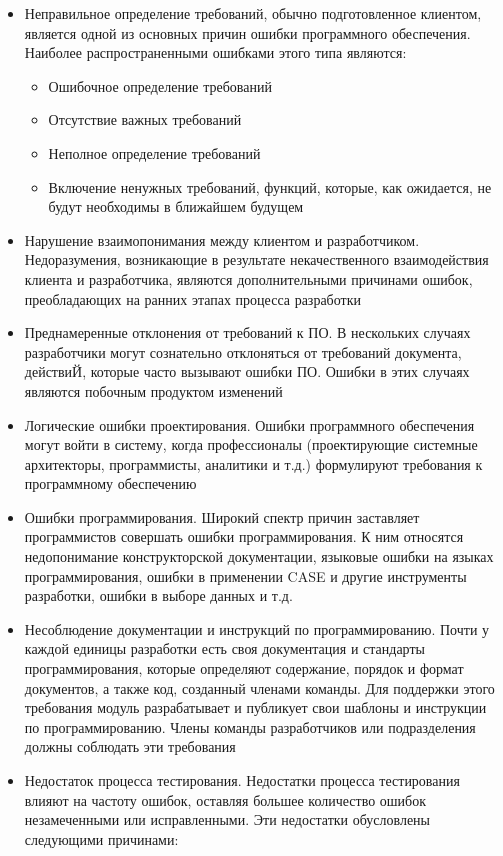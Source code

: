 \documentclass{../industrial-development}
\begin{document}
 	 \begin{itemize}
\item Неправильное определение требований, обычно подготовленное клиентом, является одной из основных причин ошибки программного обеспечения. Наиболее распространенными ошибками этого типа являются:
		\begin{itemize}
	\item Ошибочное определение требований
	\item Отсутствие важных требований
	\item Неполное определение требований
	\item Включение ненужных требований, функций, которые, как ожидается, не будут необходимы в ближайшем будущем
  		\end{itemize}
\item Нарушение взаимопонимания между клиентом и разработчиком. Недоразумения, возникающие в результате некачественного взаимодействия клиента и разработчика, являются дополнительными причинами ошибок, преобладающих на ранних этапах процесса разработки
\item Преднамеренные отклонения от требований к ПО. В нескольких случаях разработчики могут сознательно отклоняться от требований документа, действиЙ, которые часто вызывают ошибки ПО. Ошибки в этих случаях являются побочным продуктом изменений
\item Логические ошибки проектирования. Ошибки программного обеспечения могут войти в систему, когда профессионалы (проектирующие системные архитекторы, программисты, аналитики и т.д.) формулируют требования к программному обеспечению
\item Ошибки программирования. Широкий спектр причин заставляет программистов совершать ошибки программирования. К ним относятся недопонимание конструкторской документации, языковые ошибки на языках программирования, ошибки в применении CASE и другие инструменты разработки, ошибки в выборе данных и т.д.
\item Несоблюдение документации и инструкций по программированию. Почти у каждой единицы разработки есть своя документация и стандарты программирования, которые определяют содержание, порядок и формат документов, а также код, созданный членами команды. Для поддержки этого требования модуль разрабатывает и публикует свои шаблоны и инструкции по программированию. Члены команды разработчиков или подразделения должны соблюдать эти требования
\item Недостаток процесса тестирования. Недостатки процесса тестирования влияют на частоту ошибок, оставляя большее количество ошибок незамеченными или исправленными. Эти недостатки обусловлены следующими причинами:

\end{itemize}
\end{document}
